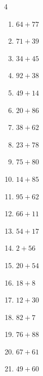 \begin{multicols}{4}
\begin{enumerate}
  \item $64+77$
        \phantom{$=141$}

  \item $71+39$
        \phantom{$=110$}

  \item $34+45$
        \phantom{$=79$}

  \item $92+38$
        \phantom{$=130$}

  \item $49+14$
        \phantom{$=63$}

  \item $20+86$
        \phantom{$=106$}

  \item $38+62$
        \phantom{$=100$}

  \item $23+78$
        \phantom{$=101$}

  \item $75+80$
        \phantom{$=155$}

  \item $14+85$
        \phantom{$=99$}

  \item $95+62$
        \phantom{$=157$}

  \item $66+11$
        \phantom{$=77$}

\columnbreak %

\resetques

  \item $54+17$
        \phantom{$=71$}

  \item $2+56$
        \phantom{$=58$}

  \item $20+54$
        \phantom{$=74$}

  \item $18+8$
        \phantom{$=26$}

  \item $12+30$
        \phantom{$=42$}

  \item $82+7$
        \phantom{$=89$}

  \item $76+88$
        \phantom{$=164$}

  \item $67+61$
        \phantom{$=128$}

  \item $49+60$
        \phantom{$=109$}


\end{enumerate}
\end{multicols}
